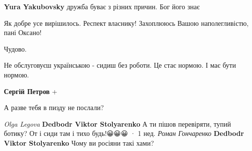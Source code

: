 \begin{itemize}
\begin{itemize}
\textbf{Yura Yakubovsky} дружба буває з різних причин. Бог його знає

\end{itemize}

 
Як добре усе вирішилось. Респект власнику!
Захоплююсь Вашою наполегливістю, пані Оксано!

 
Чудово.

 
Не обслуговуєш українською - сидиш без роботи. Це стає нормою. І має бути нормою.

\begin{itemize}
 
\textbf{Сергій Петров} +
\end{itemize}

 
А разве тебя в пизду не послали?

\begin{itemize}
\emph{Olga Legova}
\textbf{Dedbodr Viktor Stolyarenko} А ти пішов перевіряти, тупий ботику? От і сиди там і тихо будь!😀😀😀
 · 1 нед.
\emph{Роман Гончаренко}
\textbf{Dedbodr Viktor Stolyarenko} Чому ви росіяни такі хами?
\end{itemize}


\end{itemize}
